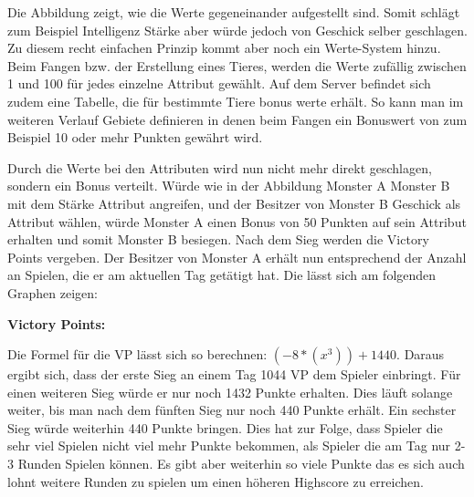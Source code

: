 Die Abbildung zeigt, wie die Werte gegeneinander aufgestellt sind. Somit schlägt zum Beispiel Intelligenz Stärke aber würde jedoch von Geschick selber geschlagen. Zu diesem recht einfachen Prinzip kommt aber noch ein Werte-System hinzu. Beim Fangen bzw. der Erstellung eines Tieres, werden die Werte zufällig zwischen 1 und 100 für jedes einzelne Attribut gewählt. Auf dem Server befindet sich zudem eine Tabelle, die für bestimmte Tiere bonus werte erhält. So kann man im weiteren Verlauf Gebiete definieren in denen beim Fangen ein Bonuswert von zum Beispiel 10 oder mehr Punkten gewährt wird.

%
%


Durch die Werte bei den Attributen wird nun nicht mehr direkt geschlagen, sondern ein Bonus verteilt. Würde wie in der Abbildung Monster A Monster B mit dem Stärke Attribut angreifen, und der Besitzer von Monster B Geschick als Attribut wählen, würde Monster A einen Bonus von 50 Punkten auf sein Attribut erhalten und somit Monster B besiegen. Nach dem Sieg werden die Victory Points vergeben. Der Besitzer von Monster A erhält nun entsprechend der Anzahl an Spielen, die er am aktuellen Tag getätigt hat.
Die lässt sich am folgenden Graphen zeigen:

\textbf{Victory Points:}


Die Formel für die VP lässt sich so berechnen: $(-8*(x^3))+1440$. 
Daraus ergibt sich, dass der erste Sieg an einem Tag 1044 VP dem Spieler einbringt. Für einen weiteren Sieg würde er nur noch 1432 Punkte erhalten. Dies läuft solange weiter, bis man nach dem fünften Sieg nur noch 440 Punkte erhält. Ein sechster Sieg würde weiterhin 440 Punkte bringen. Dies hat zur Folge, dass Spieler die sehr viel Spielen nicht viel mehr Punkte bekommen, als Spieler die am Tag nur 2-3 Runden Spielen können. Es gibt aber weiterhin so viele Punkte das es sich auch lohnt weitere Runden zu spielen um einen höheren Highscore zu erreichen. 

